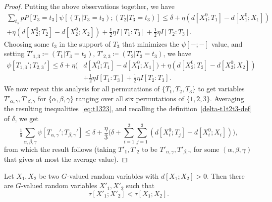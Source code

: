 \begin{proof}
  Putting the above observations together, we have
  \begin{align*}
   \sum_{t_3}p P[T_3=t_3] \psi[(T_1 | T_3=t_3); (T_2 | T_3=t_3)] \leq \delta + \eta (d[X^0_1;T_1]-d[X^0_1;X_1]) \\
     + \eta (d[X^0_2;T_2]-d[X^0_2;X_2]) + \tfrac12 \eta I[T_1:T_3] + \tfrac12 \eta I[T_2:T_3].
   \end{align*}
   Choosing some $t_3$ in the support of $T_3$ that minimizes the $\psi[-;-]$ value, and setting $T'_{1,3} \coloneqq (T_1 | T_3 = t_3)$, $T'_{2,3} \coloneqq (T_2 | T_3 = t_3)$, we have
  \begin{align}\nonumber
   \psi[T_{1,3}';T_{2,3}'] \leq \delta + \eta (& d[X^0_1;T_1]-d[X^0_1;X_1])
      + \eta (d[X^0_2;T_2]-d[X^0_2;X_2]) \\ & + \tfrac12 \eta I[T_1:T_3] + \tfrac12 \eta I[T_2:T_3].
     \label{eq:t1323}
  \end{align}
  We now repeat this analysis for all permutations of $\{T_1,T_2,T_3\}$ to get variables $T'_{\alpha,\gamma}, T'_{\beta,\gamma}$ for $\{\alpha,\beta,\gamma\}$ ranging over all six permutations of $\{1,2,3\}$.
  Averaging the resulting inequalities~\eqref{eq:t1323}, and recalling the definition~\eqref{delta-t1t2t3-def} of $\delta$, we get
  \[ \tfrac16 \sum_{\alpha,\beta,\gamma} \psi[T_{\alpha,\gamma}';T_{\beta,\gamma}']  \leq  \delta + \frac{\eta}{3} \biggl( \delta + \sum_{i=1}^2 \sum_{j = 1}^3 (d[X^0_i;T_j]-d[X^0_i;X_i]) \biggr),
  \]
  from which the result follows (taking $T'_1,T'_2$ to be $T'_{\alpha,\gamma},T'_{\beta,\gamma}$ for some $(\alpha,\beta,\gamma)$ that gives at most the average value).
\end{proof}




\begin{theorem}\label{de-prop}
  \leanok
  Let $X_1, X_2$ be two $G$-valued random variables with $d[X_1;X_2] > 0$. Then there are $G$-valued random variables $X'_1, X'_2$ such that
$$\tau[X'_1;X'_2] < \tau[X_1;X_2].
$$
\end{theorem}

